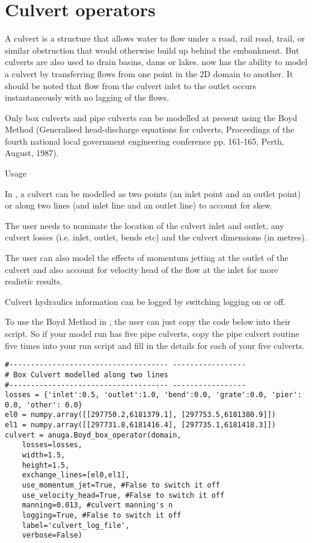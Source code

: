 \documentclass{manual}
\begin{document}
\section{Culvert operators}

A culvert is a structure that allows water to flow under a road, rail road, trail, or similar obstruction that would otherwise build up behind the embankment. But culverts are also used to drain basins, dams or lakes. \anuga now has the ability to model a culvert by transferring flows from one point in the 2D domain to another. It should be noted that flow from the culvert inlet to the outlet occurs instantaneously with no lagging of the flows.

Only box culverts and pipe culverts can be modelled at present using the Boyd Method (Generalised head-discharge equations for culverts, Proceedings of the fourth national local government engineering conference pp. 161-165, Perth, August, 1987).

Usage

In \anuga, a culvert can be modelled as two points (an inlet point and an outlet point) or along two lines (and inlet line and an outlet line) to account for skew.

The user needs to nominate the location of the culvert inlet and outlet, any culvert losses (i.e. inlet, outlet, bends etc) and the culvert dimensions (in metres).

The user can also model the effects of momentum jetting at the outlet of the culvert and also account for velocity head of the flow at the inlet for more realistic results.

Culvert hydraulics information can be logged by switching logging on or off.

To use the Boyd Method in \anuga, the user can just copy the code below into their script. So if your model run has five pipe culverts, copy the pipe culvert routine five times into your run script and fill in the details for each of your five culverts.
\begin{verbatim}
#------------------------------------- -----------------
# Box Culvert modelled along two lines
#------------------------------------- -----------------
losses = {'inlet':0.5, 'outlet':1.0, 'bend':0.0, 'grate':0.0, 'pier': 0.0, 'other': 0.0}
el0 = numpy.array([[297750.2,6181379.1], [297753.5,6181380.9]])
el1 = numpy.array([[297731.8,6181416.4], [297735.1,6181418.3]])
culvert = anuga.Boyd_box_operator(domain,
    losses=losses,
    width=1.5,
    height=1.5,
    exchange_lines=[el0,el1],
    use_momentum_jet=True, #False to switch it off
    use_velocity_head=True, #False to switch it off
    manning=0.013, #culvert manning's n
    logging=True, #False to switch it off
    label='culvert_log_file',
    verbose=False)
\end{verbatim}
\end{document}
